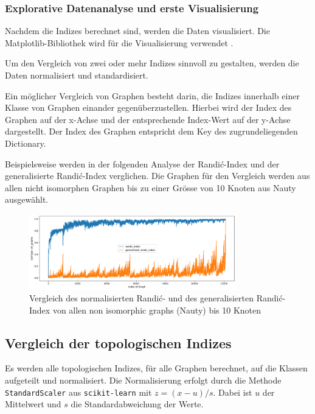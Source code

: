\subsubsection{Explorative Datenanalyse und erste Visualisierung}

Nachdem die Indizes berechnet sind, werden die Daten visualisiert. Die Matplotlib-Bibliothek wird für die Visualisierung verwendet \cite{Hunter:2007}.

Um den Vergleich von zwei oder mehr Indizes sinnvoll zu gestalten, werden die Daten normalisiert und standardisiert.

Ein möglicher Vergleich von Graphen besteht darin, die Indizes innerhalb einer Klasse von Graphen einander gegenüberzustellen. Hierbei wird der Index des Graphen auf der x-Achse und der entsprechende Index-Wert auf der y-Achse dargestellt. Der Index des Graphen entspricht dem Key des zugrundeliegenden Dictionary.

Beispielsweise werden in der folgenden Analyse der Randić-Index und der generalisierte Randić-Index verglichen. Die Graphen für den Vergleich werden aus allen nicht isomorphen Graphen bis zu einer Grösse von 10 Knoten aus Nauty ausgewählt.

\begin{figure}[H]
    \centering
    \includegraphics[width=9cm]{images/42_data/explorative_analysis_nauty.png}
    \caption{Vergleich des normalisierten Randić- und des generalisierten Randić-Index von allen non isomorphic graphs (Nauty) bis 10 Knoten}
    \label{fig:explorative_analysis}
\end{figure}


\subsection{Vergleich der topologischen Indizes}

Es werden alle topologischen Indizes, für alle Graphen berechnet, auf die Klassen aufgeteilt und normalisiert.
Die Normalisierung erfolgt durch die Methode \texttt{StandardScaler} aus \texttt{scikit-learn} mit $ z = (x-u) / s $.
Dabei ist $u$ der Mittelwert und $s$ die Standardabweichung der Werte.

